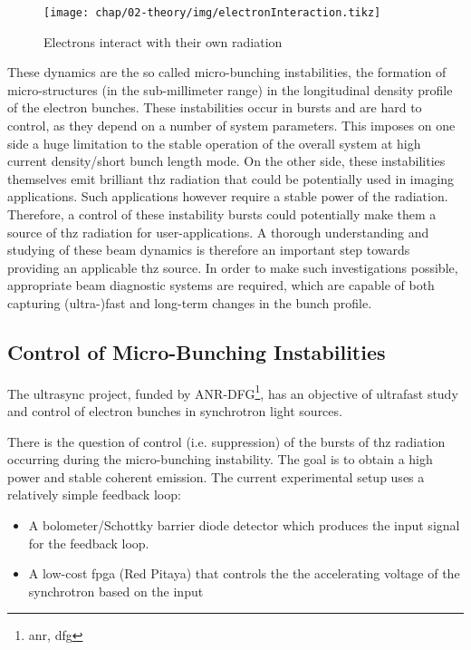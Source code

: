 \begin{figure}[tbh]
	\centering
	\texttt{[image: chap/02-theory/img/electronInteraction.tikz]}
	\caption{Electrons interact with their own radiation \cite{Bielawski2019}}
	\label{fig:electronInteract}
\end{figure}
These dynamics are the so called micro-bunching instabilities, the formation of micro-structures (in the sub-millimeter range) in the longitudinal density profile of the electron bunches.
These instabilities occur in bursts and are hard to control, as they depend on a number of system parameters.
This imposes on one side a huge limitation to the stable operation of the overall system at high current density/short bunch length mode.
On the other side, these instabilities themselves emit brilliant \gls{thz} radiation that could be potentially used in imaging applications.
Such applications however require a stable power of the radiation. 
Therefore, a control of these instability bursts could potentially make them a source of \gls{thz} radiation for user-applications. 
A thorough understanding and studying of these beam dynamics is therefore an important step towards providing an applicable \gls{thz} source. \cite{rota2018,brosi}
In order to make such investigations possible, appropriate beam diagnostic systems are required, which are capable of both capturing (ultra-)fast and long-term changes in the bunch profile.  

\subsection*{Control of Micro-Bunching Instabilities}
The \gls{ultrasync} project, funded by ANR-DFG\footnote{\gls{anr}, \gls{dfg}}, has an objective of ultrafast study and control of electron bunches in synchrotron light sources.

There is the question of control (i.e. suppression) of the bursts of \gls{thz} radiation occurring during the micro-bunching instability.
The goal is to obtain a high power and stable coherent emission. 
The current experimental setup uses a relatively simple feedback loop:
\begin{itemize}
	\item A bolometer/Schottky barrier diode detector which produces the input signal for the feedback loop.
	\item A low-cost \gls{fpga} (Red Pitaya) that controls the the accelerating voltage of the synchrotron based on the input
\end{itemize} %

